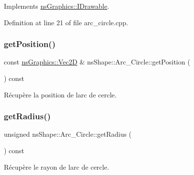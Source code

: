 Implements \hyperlink{classns_graphics_1_1_i_drawable_abed8a61e1d507d31e76f0891f3bf9c51}{ns\+Graphics\+::\+I\+Drawable}.



Definition at line 21 of file arc\+\_\+circle.\+cpp.

\mbox{\label{classns_shape_1_1_arc___circle_a931e29f1d186676dd84e376dc6576254}} 
\subsubsection{\texorpdfstring{get\+Position()}{getPosition()}}
{\footnotesize\ttfamily const \hyperlink{classns_graphics_1_1_vec2_d}{ns\+Graphics\+::\+Vec2D} \& ns\+Shape\+::\+Arc\+\_\+\+Circle\+::get\+Position (\begin{DoxyParamCaption}{ }\end{DoxyParamCaption}) const}



Récupère la position de l\textquotesingle{}arc de cercle. 

\mbox{\label{classns_shape_1_1_arc___circle_a7fbd0dc94a0a3de9fcb9352156e50d3b}} 
\subsubsection{\texorpdfstring{get\+Radius()}{getRadius()}}
{\footnotesize\ttfamily unsigned ns\+Shape\+::\+Arc\+\_\+\+Circle\+::get\+Radius (\begin{DoxyParamCaption}{ }\end{DoxyParamCaption}) const}



Récupère le rayon de l\textquotesingle{}arc de cercle. 

\mbox{\label{classns_shape_1_1_arc___circle_a11a5569112bf39b90192c7d7e0678736}} 
